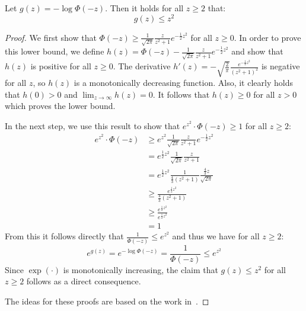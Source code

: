 \begin{lemma}
    Let $g(z) = -\log \Phi(-z)$. Then it holds for all $z \geq 2$ that:
    $$
        g(z) \leq z^2
    $$
\end{lemma}
\begin{proof}
    We first show that $\Phi(-z) \geq \frac{1}{\sqrt{2 \pi}} \frac{z}{z^2 + 1} e^{-\frac{1}{2} z^2}$
    for all $z \geq 0$.
    In order to prove this lower bound, we define
    $h(z) = \Phi(-z) - \frac{1}{\sqrt{2 \pi}} \frac{z}{z^2 + 1} e^{-\frac{1}{2} z^2}$
    and show that $h(z)$ is positive for all $z \geq 0$.
    The derivative $h'(z) = -\sqrt{\frac{2}{\pi}} \frac{e^{-\frac{1}{2} z^2}}{(z^2 + 1)^2}$ is
    negative for all $z$, so $h(z)$ is a monotonically decreasing function.
    Also, it clearly holds that $h(0) > 0$ and
    $\lim_{z \rightarrow \infty} h(z) = 0$. It follows that $h(z) \geq 0$
    for all $z > 0$ which proves the lower bound.

    In the next step, we use this result to show that $e^{z^2} \cdot \Phi(-z) \geq 1$
    for all $z \geq 2$:
    \begin{align*}
        e^{z^2} \cdot \Phi(-z) & \geq e^{z^2} \frac{1}{\sqrt{2 \pi}} \frac{z}{z^2 + 1} e^{-\frac{1}{2} z^2}                           \\
                               & = e^{\frac{1}{2} z^2} \frac{1}{\sqrt{2 \pi}} \frac{z}{z^2 + 1}                                       \\
                               & = e^{\frac{1}{2} z^2} \frac{1}{\frac{4}{3}\left( z^2 + 1 \right)} \frac{\frac{4}{3} z}{\sqrt{2 \pi}} \\
                               & \geq \frac{e^{\frac{1}{2} z^2}}{\frac{4}{3}\left( z^2 + 1 \right)}                                   \\
                               & \geq \frac{e^{\frac{1}{2} z^2}}{e^{\frac{1}{2} z^2}}                                                 \\
                               & = 1
    \end{align*}
    From this it follows directly that $\frac{1}{\Phi(-z)} \leq e^{z^2}$
    and thus we have for all $z \geq 2$:
    $$
        e^{g(z)} = e^{-\log \Phi(-z)} = \frac{1}{\Phi(-z)} \leq e^{z^2}
    $$
    Since $\exp{\left( \cdot \right)}$ is monotonically increasing, the claim
    that $g(z) \leq z^2$ for all $z \geq 2$ follows as a direct consequence.

    The ideas for these proofs are based on the work in~\cite{gaussian_bounds}.
\end{proof}


